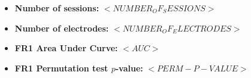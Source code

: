 \begin{itemize}
    \item\textbf{Number of sessions: }$<NUMBER_OF_SESSIONS>$
    \item\textbf{Number of electrodes: }$<NUMBER_OF_ELECTRODES>$
    \item\textbf{FR1 Area Under Curve: }$<AUC>$
    \item\textbf{FR1 Permutation test $p$-value:} $<PERM-P-VALUE>$
\end{itemize}
